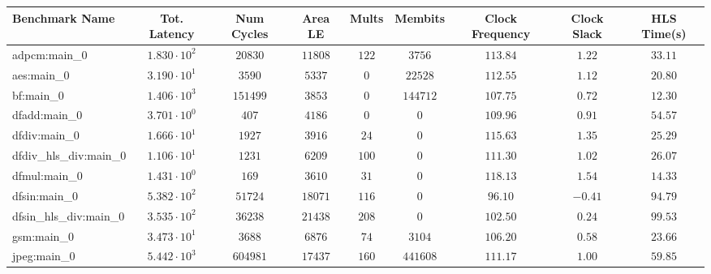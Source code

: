 \begin{tabular}{|l|c|c|c|c|c|c|c|c|}
\hline
Benchmark Name          & Tot. Latency           & Num Cycles  & Area LE    & Mults   & Membits    & Clock Frequency & Clock Slack & HLS Time(s) \\
\hline
adpcm:main\_0           & $ 1.830 \cdot 10^{2} $ & $ 20830   $ & $ 11808  $ & $ 122 $ & $ 3756   $ & $ 113.84      $ & $ 1.22    $ & $ 33.11   $ \\
aes:main\_0             & $ 3.190 \cdot 10^{1} $ & $ 3590    $ & $ 5337   $ & $ 0   $ & $ 22528  $ & $ 112.55      $ & $ 1.12    $ & $ 20.80   $ \\
bf:main\_0              & $ 1.406 \cdot 10^{3} $ & $ 151499  $ & $ 3853   $ & $ 0   $ & $ 144712 $ & $ 107.75      $ & $ 0.72    $ & $ 12.30   $ \\
dfadd:main\_0           & $ 3.701 \cdot 10^{0} $ & $ 407     $ & $ 4186   $ & $ 0   $ & $ 0      $ & $ 109.96      $ & $ 0.91    $ & $ 54.57   $ \\
dfdiv:main\_0           & $ 1.666 \cdot 10^{1} $ & $ 1927    $ & $ 3916   $ & $ 24  $ & $ 0      $ & $ 115.63      $ & $ 1.35    $ & $ 25.29   $ \\
dfdiv\_hls\_div:main\_0 & $ 1.106 \cdot 10^{1} $ & $ 1231    $ & $ 6209   $ & $ 100 $ & $ 0      $ & $ 111.30      $ & $ 1.02    $ & $ 26.07   $ \\
dfmul:main\_0           & $ 1.431 \cdot 10^{0} $ & $ 169     $ & $ 3610   $ & $ 31  $ & $ 0      $ & $ 118.13      $ & $ 1.54    $ & $ 14.33   $ \\
dfsin:main\_0           & $ 5.382 \cdot 10^{2} $ & $ 51724   $ & $ 18071  $ & $ 116 $ & $ 0      $ & $ 96.10       $ & $ -0.41   $ & $ 94.79   $ \\
dfsin\_hls\_div:main\_0 & $ 3.535 \cdot 10^{2} $ & $ 36238   $ & $ 21438  $ & $ 208 $ & $ 0      $ & $ 102.50      $ & $ 0.24    $ & $ 99.53   $ \\
gsm:main\_0             & $ 3.473 \cdot 10^{1} $ & $ 3688    $ & $ 6876   $ & $ 74  $ & $ 3104   $ & $ 106.20      $ & $ 0.58    $ & $ 23.66   $ \\
jpeg:main\_0            & $ 5.442 \cdot 10^{3} $ & $ 604981  $ & $ 17437  $ & $ 160 $ & $ 441608 $ & $ 111.17      $ & $ 1.00    $ & $ 59.85   $ \\

\end{tabular}
